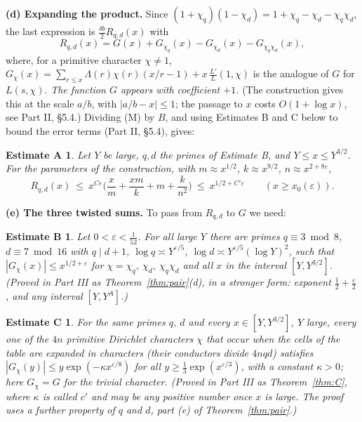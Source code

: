 \documentclass[11pt,letterpaper]{article}
\newtheorem*{thmA}{Estimate A}
\newtheorem*{thmB}{Estimate B}
\newtheorem*{thmC}{Estimate C}
\begin{document}
\textbf{(d) Expanding the product.} Since $(1+\chi_q)(1-\chi_d)=1+\chi_q-\chi_d-\chi_q\chi_d$, the last
expression is $\frac{\delta b}2R_{q,d}(x)$ with
\begin{equation}\label{D:29}
 R_{q,d}(x)=G(x)+G_{\chi_q}(x)-G_{\chi_d}(x)-G_{\chi_q\chi_d}(x),
\end{equation}
where, for a primitive character $\chi\ne1$, $G_\chi(x)=\sum_{r\le x}\Lambda(r)\chi(r)(x/r-1)+x\,\frac{L'}L(1,\chi)$ is the analogue of $G$ for
$L(s,\chi)$. \emph{The function $G$ appears with coefficient $+1$.} (The construction gives this at the scale $a/b$,
with $|a/b-x|\le1$; the passage to $x$ costs $O(1+\log x)$, see Part II, \S5.4.) Dividing (M) by $B$, and using Estimates B
and C below to bound the error terms (Part II, \S5.4), gives:

\begin{thmA} Let $Y$ be large, $q,d$ the primes of Estimate B, and $Y\le x\le Y^{3/2}$. For the parameters
of the construction, with $m\approx x^{1/2}$, $k\approx x^{9/2}$, $n\approx x^{2+8\varepsilon}$,
\begin{equation}\label{D:30}
 R_{q,d}(x)\ \le\ x^{C\varepsilon}\Big(\frac xm+\frac{xm}k+m+\frac k{n^2}\Big)\ \le\ x^{1/2+C'\varepsilon}
 \qquad(x\ge x_0(\varepsilon)).
\end{equation}
\end{thmA}

\textbf{(e) The three twisted sums.} To pass from $R_{q,d}$ to $G$ we need:

\begin{thmB} Let $0<\varepsilon<\frac1{52}$. For all large $Y$ there are primes $q\equiv3\bmod8$, $d\equiv7\bmod16$ with $q\mid d+1$, $\log q\asymp Y^{\varepsilon/5}$, $\log d\asymp Y^{\varepsilon/5}(\log Y)^2$, such that $|G_\chi(x)|\le x^{1/2+\varepsilon}$ for
$\chi=\chi_q,\ \chi_d,\ \chi_q\chi_d$ and all $x$ in the interval $[Y,Y^{3/2}]$. (Proved in Part III as Theorem~\ref{thm:pair}(d), in a
stronger form: exponent $\frac12+\frac\varepsilon2$, and any interval $[Y,Y^A]$.)
\end{thmB}

\begin{thmC} For the same primes $q$, $d$ and every $x\in[Y,Y^{3/2}]$, $Y$ large, every one of the $4n$ primitive Dirichlet characters $\chi$ that occur when
the cells of the table are expanded in characters (their conductors divide $4nqd$) satisfies
$|G_\chi(y)|\le y\exp(-\kappa x^{\varepsilon/8})$ for all $y\ge\frac13\exp(x^{\varepsilon/3})$, with a constant
$\kappa>0$; here $G_\chi=G$ for the trivial character. (Proved in Part III as Theorem~\ref{thm:C}, where $\kappa$ is called $c'$ and may be any positive number
once $x$ is large. The proof uses a further property of $q$ and $d$, part (e) of Theorem~\ref{thm:pair}.)
\end{thmC}
\end{document}
